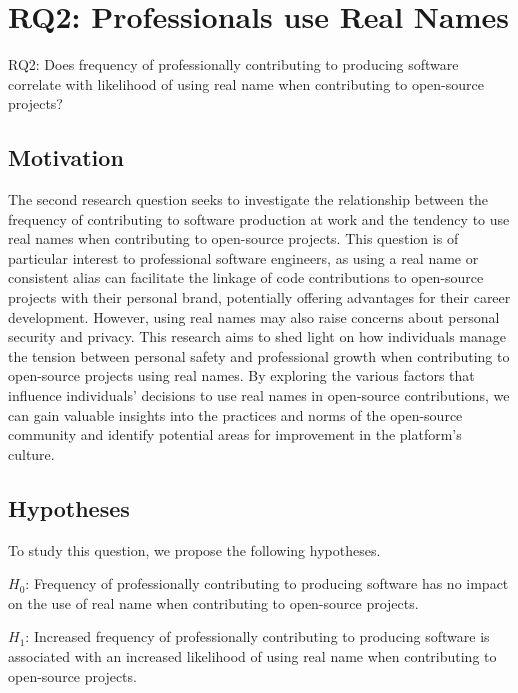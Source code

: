 \documentclass[journal,12pt,onecolumn,]{IEEEtran}
\begin{document}
\section{RQ2: Professionals use Real Names}
RQ2: Does frequency of professionally contributing to producing software correlate with likelihood of using real name when contributing to open-source projects?
\subsection{Motivation}


The second research question seeks to investigate the relationship between the frequency of contributing to software production at work and the tendency to use real names when contributing to open-source projects. 
This question is of particular interest to professional software engineers, as using a real name or consistent alias can facilitate the linkage of code contributions to open-source projects with their personal brand, 
potentially offering advantages for their career development. However, using real names may also raise concerns about personal security and privacy. 
This research aims to shed light on how individuals manage the tension between personal safety and professional growth when contributing to open-source projects using real names. 
By exploring the various factors that influence individuals' decisions to use real names in open-source contributions, we can gain valuable insights into the practices and norms of the open-source community and identify potential areas for improvement in the platform's culture.

\subsection{Hypotheses}
To study this question, we propose the following hypotheses.

$H_0$: Frequency of professionally contributing to producing software has no impact on the use of real name when contributing to open-source projects.

$H_1$: Increased frequency of professionally contributing to producing software is associated with an increased likelihood of using real name when contributing to open-source projects.
\end{document}
